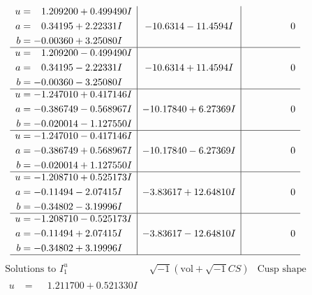 \documentclass[1p]{elsarticle_modified}
\theoremstyle{definition}
\newcommand{\I}{\sqrt{-1}}
\begin{document}
$$\begin{array}{c|c|c}
\begin{aligned}
u &= \phantom{-}1.209200 + 0.499490 I \\
a &= \phantom{-}0.34195 + 2.22331 I \\
b &= -0.00360 + 3.25080 I\end{aligned}
 & -10.6314 - 11.4594 I & \phantom{-0.000000 } 0 \\ \hline\begin{aligned}
u &= \phantom{-}1.209200 - 0.499490 I \\
a &= \phantom{-}0.34195 - 2.22331 I \\
b &= -0.00360 - 3.25080 I\end{aligned}
 & -10.6314 + 11.4594 I & \phantom{-0.000000 } 0 \\ \hline\begin{aligned}
u &= -1.247010 + 0.417146 I \\
a &= -0.386749 - 0.568967 I \\
b &= -0.020014 - 1.127550 I\end{aligned}
 & -10.17840 + 6.27369 I & \phantom{-0.000000 } 0 \\ \hline\begin{aligned}
u &= -1.247010 - 0.417146 I \\
a &= -0.386749 + 0.568967 I \\
b &= -0.020014 + 1.127550 I\end{aligned}
 & -10.17840 - 6.27369 I & \phantom{-0.000000 } 0 \\ \hline\begin{aligned}
u &= -1.208710 + 0.525173 I \\
a &= -0.11494 - 2.07415 I \\
b &= -0.34802 - 3.19996 I\end{aligned}
 & -3.83617 + 12.64810 I & \phantom{-0.000000 } 0 \\ \hline\begin{aligned}
u &= -1.208710 - 0.525173 I \\
a &= -0.11494 + 2.07415 I \\
b &= -0.34802 + 3.19996 I\end{aligned}
 & -3.83617 - 12.64810 I & \phantom{-0.000000 } 0\\
 \hline 
 \end{array}$$\newpage$$\begin{array}{c|c|c}  
\text{Solutions to }I^u_{1}& \I (\text{vol} + \sqrt{-1}CS) & \text{Cusp shape}\\
 \hline 
\begin{aligned}
u &= \phantom{-}1.211700 + 0.521330 I \\

\end{aligned}
\end{array}$$
\end{document}

